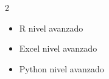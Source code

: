 \documentclass[10pt,letterpaper,ragged2e]{altacv}
\begin{document}
\begin{paracol}{2}

\begin{itemize}
\item R nivel avanzado
\item Excel nivel avanzado
\item Python nivel avanzado

\end{itemize}
\divider
\medskip


\end{paracol}
\end{document}
